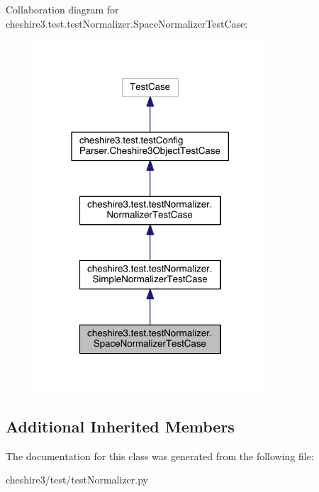 Collaboration diagram for cheshire3.\-test.\-test\-Normalizer.\-Space\-Normalizer\-Test\-Case\-:
\nopagebreak
\begin{figure}[H]
\begin{center}
\leavevmode
\includegraphics[width=246pt]{classcheshire3_1_1test_1_1test_normalizer_1_1_space_normalizer_test_case__coll__graph}
\end{center}
\end{figure}
\subsection*{Additional Inherited Members}


The documentation for this class was generated from the following file\-:\begin{DoxyCompactItemize}
\item 
cheshire3/test/test\-Normalizer.\-py\end{DoxyCompactItemize}
